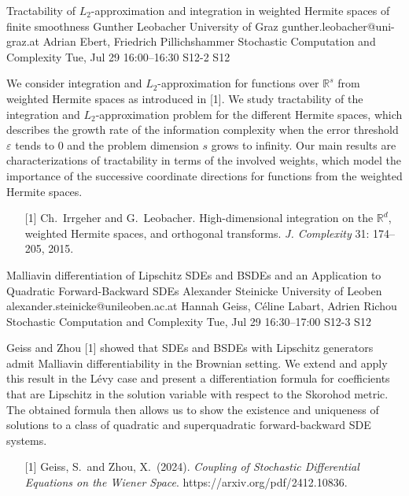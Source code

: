 \begin{talk}
  {Tractability of $L_2$-approximation and integration in weighted Hermite spaces of finite smoothness}%
  {Gunther Leobacher}%
  {University of Graz}%
  {gunther.leobacher@uni-graz.at}%
  {Adrian Ebert, Friedrich Pillichshammer}%
  {Stochastic Computation and Complexity}%
  {Tue, Jul 29 16:00–16:30}%
  {S12-2}%
  {S12}%
				
			

We consider integration and $L_2$-approximation for functions over $\mathbb R^s$ from weighted Hermite spaces as introduced in [1]. We study tractability of the integration and $L_2$-approximation problem for the different Hermite spaces, which describes the growth rate of the information complexity when the error threshold $\varepsilon$ tends to 0 and the problem dimension $s$ grows to infinity. Our main results are characterizations of tractability in terms of the involved weights, which  model the importance of the successive coordinate directions for functions from the weighted Hermite spaces.

\medskip

\begin{enumerate}
	\item[{[1]}] Ch.~Irrgeher and G.~Leobacher. High-dimensional integration on the $\mathbb R^d$, weighted Hermite spaces, and orthogonal transforms. \textit{J. Complexity} 31: 174--205, 2015. 
\end{enumerate}


\end{talk}

\begin{talk}
  {Malliavin differentiation of Lipschitz SDEs and BSDEs and an Application to Quadratic Forward-Backward SDEs}%
  {Alexander Steinicke}%
  {University of Leoben}%
  {alexander.steinicke@unileoben.ac.at}%
  {Hannah Geiss, C\'eline Labart, Adrien Richou}%
  {Stochastic Computation and Complexity}%
  {Tue, Jul 29 16:30–17:00}%
  {S12-3}%
  {S12}%
				
			
Geiss and Zhou [1] showed that SDEs and BSDEs with Lipschitz generators admit Malliavin differentiability in the Brownian setting. We extend and apply this result in the L\'evy case and present a differentiation formula for coefficients that are Lipschitz in the solution variable with respect to the Skorohod metric. The obtained formula then allows us to show the existence and uniqueness of solutions to a class of quadratic and superquadratic forward-backward SDE systems.

\medskip

\begin{enumerate}
	\item[{[1]}] Geiss, S.~and Zhou, X.~(2024). {\it Coupling of Stochastic Differential Equations on the Wiener Space}. https://arxiv.org/pdf/2412.10836.
\end{enumerate}

\end{talk}

